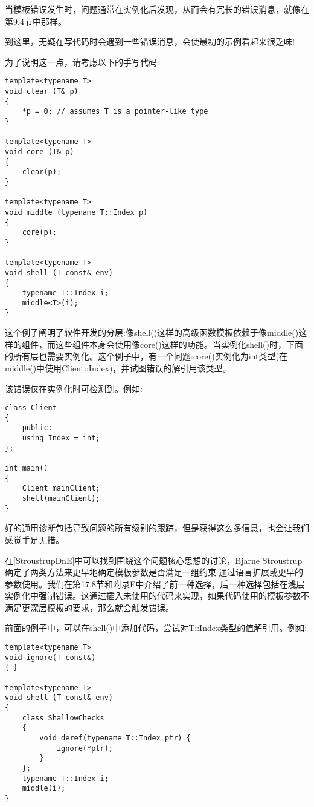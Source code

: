 当模板错误发生时，问题通常在实例化后发现，从而会有冗长的错误消息，就像在第9.4节中那样。

\begin{tcolorbox}[colback=webgreen!5!white,colframe=webgreen!75!black]
\hspace*{0.75cm}到这里，无疑在写代码时会遇到一些错误消息，会使最初的示例看起来很乏味!
\end{tcolorbox}

为了说明这一点，请考虑以下的手写代码:

\begin{lstlisting}[style=styleCXX]
template<typename T>
void clear (T& p)
{
	*p = 0; // assumes T is a pointer-like type
}

template<typename T>
void core (T& p)
{
	clear(p);
}

template<typename T>
void middle (typename T::Index p)
{
	core(p);
}

template<typename T>
void shell (T const& env)
{
	typename T::Index i;
	middle<T>(i);
}
\end{lstlisting}

这个例子阐明了软件开发的分层:像shell()这样的高级函数模板依赖于像middle()这样的组件，而这些组件本身会使用像core()这样的功能。当实例化shell()时，下面的所有层也需要实例化。这个例子中，有一个问题:core()实例化为int类型(在middle()中使用Client::Index)，并试图错误的解引用该类型。

该错误仅在实例化时可检测到。例如:

\begin{lstlisting}[style=styleCXX]
class Client
{
	public:
	using Index = int;
};

int main()
{
	Client mainClient;
	shell(mainClient);
}
\end{lstlisting}

好的通用诊断包括导致问题的所有级别的跟踪，但是获得这么多信息，也会让我们感觉手足无措。

在[StroustrupDnE]中可以找到围绕这个问题核心思想的讨论，Bjarne Stroustrup确定了两类方法来更早地确定模板参数是否满足一组约束:通过语言扩展或更早的参数使用。我们在第17.8节和附录E中介绍了前一种选择，后一种选择包括在浅层实例化中强制错误。这通过插入未使用的代码来实现，如果代码使用的模板参数不满足更深层模板的要求，那么就会触发错误。

前面的例子中，可以在shell()中添加代码，尝试对T::Index类型的值解引用。例如:

\begin{lstlisting}[style=styleCXX]
template<typename T>
void ignore(T const&)
{ }

template<typename T>
void shell (T const& env)
{
	class ShallowChecks
	{
		void deref(typename T::Index ptr) {
			ignore(*ptr);
		}
	};
	typename T::Index i;
	middle(i);
}
\end{lstlisting}

